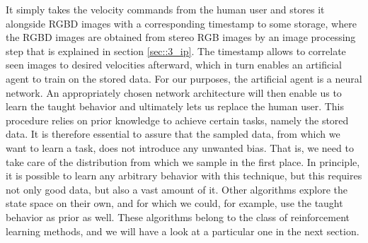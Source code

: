 It simply takes the velocity commands from the human user and stores it alongside RGBD images with a corresponding timestamp to some storage, where the RGBD images are obtained from stereo RGB images by an image processing step that is explained in section \ref{sec::3_ip}. The timestamp allows to correlate seen images to desired velocities afterward, which in turn enables an artificial agent to train on the stored data. For our purposes, the artificial agent is a neural network. An appropriately chosen network architecture will then enable us to learn the taught behavior and ultimately lets us replace the human user. This procedure relies on prior knowledge to achieve certain tasks, namely the stored data. It is therefore essential to assure that the sampled data, from which we want to learn a task, does not introduce any unwanted bias. That is, we need to take care of the distribution from which we sample in the first place. In principle, it is possible to learn any arbitrary behavior with this technique, but this requires not only good data, but also a vast amount of it. Other algorithms explore the state space on their own, and for which we could, for example, use the taught behavior as prior as well. These algorithms belong to the class of reinforcement learning methods, and we will have a look at a particular one in the next section.